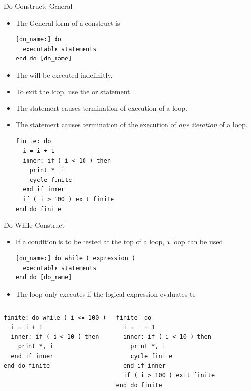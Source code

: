 \documentclass[10pt,t]{beamer}
\begin{document}
\begin{frame}[fragile]{Do Construct: General}
  \begin{itemize}
    \item The General form of a  construct is
      \begin{lstlisting}[language={[90]Fortran},basicstyle=\fontsize{6}{7}\selectfont\ttfamily]
[do_name:] do
  executable statements
end do [do_name]
      \end{lstlisting}
    \item The  will be executed indefinitly.
    \item To exit the  loop, use the  or  statement.
    \item The  statement causes termination of execution of a loop.
    \item The  statement causes termination of the execution of \textit{one iteration} of a loop.
      \begin{lstlisting}[language={[90]Fortran},basicstyle=\fontsize{6}{7}\selectfont\ttfamily]
finite: do
  i = i + 1
  inner: if ( i < 10 ) then
    print *, i
    cycle finite
  end if inner
  if ( i > 100 ) exit finite
end do finite
      \end{lstlisting}
  \end{itemize}
\end{frame}


\begin{frame}[fragile]{Do While Construct}
  \begin{itemize}
    \item If a condition is to be tested at the top of a loop, a  loop can be used
      \begin{lstlisting}[language={[90]Fortran},basicstyle=\fontsize{6}{7}\selectfont\ttfamily]
[do_name:] do while ( expression )
  executable statements
end do [do_name]
      \end{lstlisting}
    \item The loop only executes if the logical expression evaluates to 
  \end{itemize}
  \begin{columns}[t]
    \begin{lstlisting}[language={[90]Fortran},basicstyle=\fontsize{6}{7}\selectfont\ttfamily]
finite: do while ( i <= 100 )
  i = i + 1
  inner: if ( i < 10 ) then
    print *, i
  end if inner
end do finite
    \end{lstlisting}
    \begin{lstlisting}[language={[90]Fortran},basicstyle=\fontsize{6}{7}\selectfont\ttfamily]
finite: do
  i = i + 1
  inner: if ( i < 10 ) then
    print *, i
    cycle finite
  end if inner
  if ( i > 100 ) exit finite
end do finite
    \end{lstlisting}
  \end{columns}
\end{frame}
\end{document}
